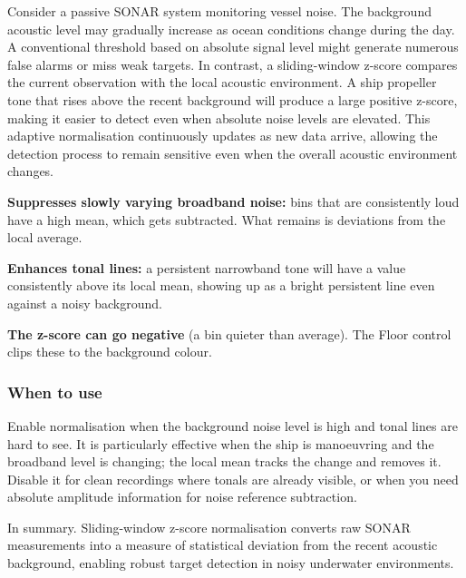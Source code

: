 \begin{faintquote}
    Consider a passive SONAR system monitoring vessel noise. The background acoustic level may gradually increase as ocean conditions change during the day. A conventional threshold based on absolute signal level might generate numerous false alarms or miss weak targets. In contrast, a sliding-window z-score compares the current observation with the local acoustic environment. A ship propeller tone that rises above the recent background will produce a large positive z-score, making it easier to detect even when absolute noise levels are elevated. This adaptive normalisation continuously updates as new data arrive, allowing the detection process to remain sensitive even when the overall acoustic environment changes.

    \begin{compactenum}
        \item \textbf{Suppresses slowly varying broadband noise:} bins that are consistently loud have a high mean, which gets subtracted. What remains is deviations from the local average.
        \item \textbf{Enhances tonal lines:} a persistent narrowband tone will have a value consistently above its local mean, showing up as a bright persistent line even against a noisy background.
        \item \textbf{The z-score can go negative} (a bin quieter than average). The Floor control clips these to the background colour.
    \end{compactenum}
\end{faintquote}

\subsubsection{When to use}

Enable normalisation when the background noise level is high and tonal lines are hard to see. It is particularly effective when the ship is manoeuvring and the broadband level is changing; the local mean tracks the change and removes it. Disable it for clean recordings where tonals are already visible, or when you need absolute amplitude information for noise reference subtraction.
\begin{faintquote}
    In summary. Sliding-window z-score normalisation converts raw SONAR measurements into a measure of statistical deviation from the recent acoustic background, enabling robust target detection in noisy underwater environments.
\end{faintquote}

